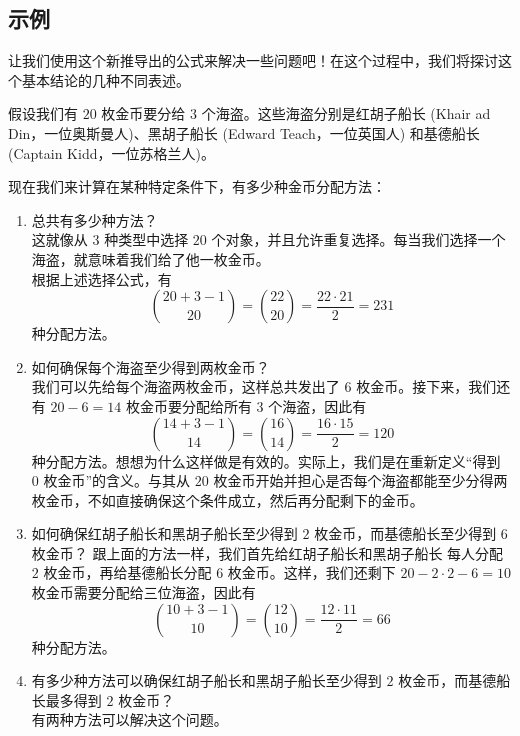 
\subsection{示例}

让我们使用这个新推导出的公式来解决一些问题吧！在这个过程中，我们将探讨这个基本结论的几种不同表述。

\begin{example}
      假设我们有 $20$ 枚金币要分给 $3$ 个海盗。这些海盗分别是红胡子船长 (Khair ad Din，一位奥斯曼人)、黑胡子船长 (Edward Teach，一位英国人) 和基德船长 (Captain Kidd，一位苏格兰人)。

      现在我们来计算在某种特定条件下，有多少种金币分配方法：
      \begin{enumerate}[label=(\arabic*)]
            \item 总共有多少种方法？\\
                  这就像从 $3$ 种类型中选择 $20$ 个对象，并且允许重复选择。每当我们选择一个海盗，就意味着我们给了他一枚金币。\\
                  根据上述选择公式，有
                  \[{20+3-1 \choose 20}={22 \choose 20}=\frac{22 \cdot 21}{2}=231\]
                  种分配方法。
            \item 如何确保每个海盗至少得到两枚金币？\\
                  我们可以先给每个海盗两枚金币，这样总共发出了 $6$ 枚金币。接下来，我们还有 $20 - 6 = 14$ 枚金币要分配给所有 $3$ 个海盗，因此有
                  \[{14+3-1 \choose 14}={16 \choose 14}=\frac{16 \cdot 15}{2}=120\]
                  种分配方法。想想为什么这样做是有效的。实际上，我们是在重新定义``得到 $0$ 枚金币''的含义。与其从 $20$ 枚金币开始并担心是否每个海盗都能至少分得两枚金币，不如直接确保这个条件成立，然后再分配剩下的金币。
            \item 如何确保红胡子船长和黑胡子船长至少得到 $2$ 枚金币，而基德船长至少得到 $6$ 枚金币？
                  跟上面的方法一样，我们首先给红胡子船长和黑胡子船长 每人分配 $2$ 枚金币，再给基德船长分配 $6$ 枚金币。这样，我们还剩下 $20 - 2 \cdot 2 - 6 = 10$ 枚金币需要分配给三位海盗，因此有
                  \[{10+3-1 \choose 10}={12 \choose 10}=\frac{12 \cdot 11}{2}=66\]
                  种分配方法。
            \item 有多少种方法可以确保红胡子船长和黑胡子船长至少得到 $2$ 枚金币，而基德船长最多得到 $2$ 枚金币？\\
                  有两种方法可以解决这个问题。
                  \begin{enumerate}[label=(\roman*)]

\end{enumerate}
\end{enumerate}
\end{example}
